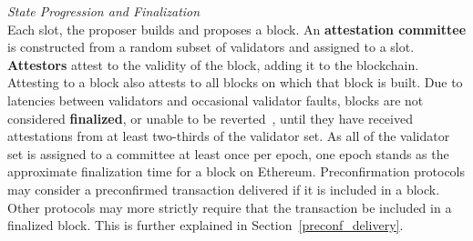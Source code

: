 \documentclass[a4paper]{article}
\theoremstyle{boldstyle}
\begin{document}
    \textit{State Progression and Finalization}  \\
        Each slot, the proposer builds and proposes a block. An \textbf{attestation committee} is constructed from a random subset of validators and assigned to a slot. \textbf{Attestors} attest to the validity of the block, adding it to the blockchain. Attesting to a block also attests to all blocks on which that block is built. Due to latencies between validators and occasional validator faults, blocks are not considered \textbf{finalized}, or unable to be reverted~\cite{ETH2_book}, until they have received attestations from at least two-thirds of the validator set. As all of the validator set is assigned to a committee at least once per epoch, one epoch stands as the approximate finalization time for a block on Ethereum. Preconfirmation protocols may consider a preconfirmed transaction delivered if it is included in a block. Other protocols may more strictly require that the transaction be included in a finalized block. This is further explained in Section~\ref{preconf_delivery}.
        
        
        
\end{document}
